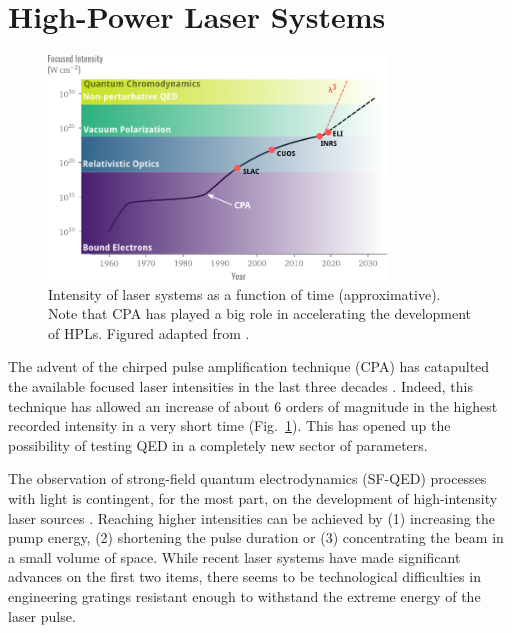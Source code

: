 \documentclass[11pt,SymmetricalJury]{inrsthesis/inrsthesis}
\begin{document}
\section{High-Power Laser Systems}

\begin{figure}
  \centering
  \includegraphics[width=0.8\textwidth]{figs/IntensityHistory.pdf}
  \caption[Short history of the intensity of laser systems.]
          {Intensity of laser systems as a function of time (approximative).
           Note that CPA has played a big role in accelerating the development
           of HPLs.
           Figured adapted from \cite{Mourou2015}.}
  \label{fig:intro.intensity-history}
\end{figure}

The advent of the chirped pulse amplification technique (CPA) has catapulted
the available focused laser intensities in the last three decades
\cite{Mourou2006}. Indeed, this technique has allowed an increase of about
6 orders of magnitude in the highest recorded intensity in a very short time
(Fig.~\ref{fig:intro.intensity-history}). 
This has opened up the possibility
of testing QED in a completely new sector of parameters.

The observation of strong-field quantum electrodynamics (SF-QED) processes with light
is contingent, for the most part, on the development of high-intensity laser sources \cite{DiPiazza2012}.
Reaching higher intensities can be achieved by (1) increasing the pump energy,
(2) shortening the pulse duration or (3) concentrating the beam in a small volume of space.
While recent laser systems have made significant advances on the first two items, there seems
to be technological difficulties in engineering gratings resistant enough to withstand the extreme
energy of the laser pulse.
\end{document}
